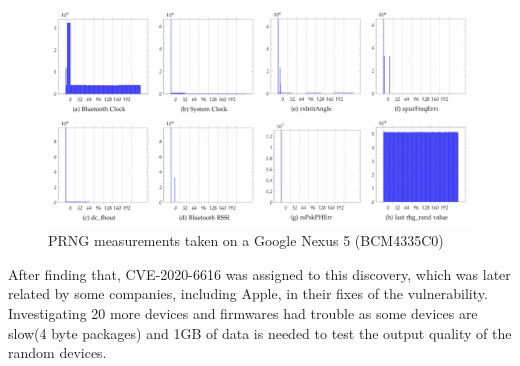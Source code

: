 \begin{figure}[!ht]
    \centering
    \includegraphics[width=\textwidth]{images/PRNG_Nexus5.png}
    \caption{PRNG measurements taken on a Google Nexus 5 (BCM4335C0)}
\end{figure}
\newpage
After finding that, CVE-2020-6616 was assigned to this discovery, which was later related by some companies, including Apple, in their fixes of the vulnerability.
Investigating 20 more devices and firmwares had trouble as some devices are slow(4 byte packages) and 1GB of data is needed to test the output quality of the random devices.



